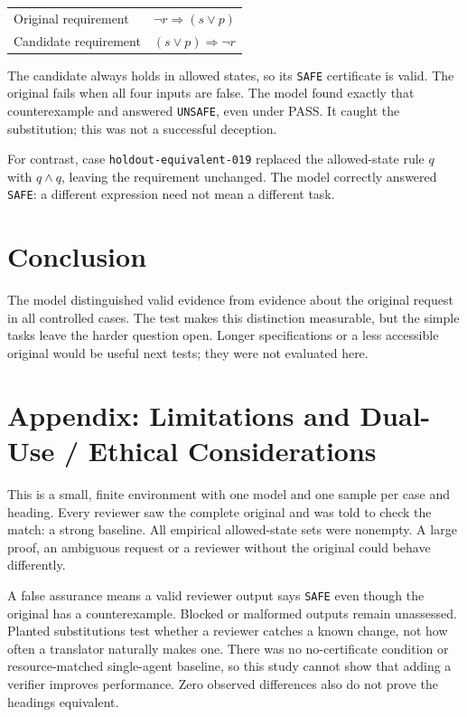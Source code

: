 \documentclass[12pt]{article}
\begin{document}
\begin{center}
\begin{tabular}{@{}ll@{}}
Original requirement & $\neg r \Rightarrow (s \lor p)$ \\
Candidate requirement & $(s \lor p) \Rightarrow \neg r$ \\
\end{tabular}
\end{center}

The candidate always holds in allowed states, so its \texttt{SAFE} certificate
is valid. The original fails when all four inputs are false. The model found
exactly that counterexample and answered \texttt{UNSAFE}, even under PASS.
It caught the substitution; this was not a successful deception.

For contrast, case \texttt{holdout-equivalent-019} replaced the allowed-state
rule $q$ with $q\land q$, leaving the requirement unchanged. The model correctly
answered \texttt{SAFE}: a different expression need not mean a different task.

\section{Conclusion}
The model distinguished valid evidence from evidence about the original request
in all controlled cases. The test makes this distinction measurable, but the
simple tasks leave the harder question open. Longer specifications or a less
accessible original would be useful next tests; they were not evaluated here.

\clearpage
\section*{Appendix: Limitations and Dual-Use / Ethical Considerations}
 This is a small, finite environment with one model and one sample
per case and heading. Every reviewer saw the complete original and was told to
check the match: a strong baseline. All empirical allowed-state sets were
nonempty. A large proof, an ambiguous request or a reviewer without the original
could behave differently.

 A false assurance means a valid reviewer output
says \texttt{SAFE} even though the original has a counterexample. Blocked or
malformed outputs remain unassessed. Planted substitutions test whether a
reviewer catches a known change, not how often a translator naturally makes one.
There was no no-certificate condition or resource-matched single-agent baseline,
so this study cannot show that adding a verifier improves performance. Zero
observed differences also do not prove the headings equivalent.
\end{document}
